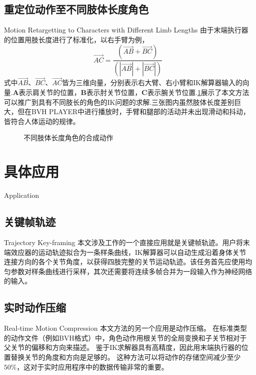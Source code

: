 \subsection{重定位动作至不同肢体长度角色}{Motion Retargetting to Characters with Different Limb Lengths}
\label{sec:Retargetting}
由于末端执行器的位置用肢长度进行了标准化，以右手臂为例，
\begin{displaymath}
\overrightarrow{AC}=\frac{(\overrightarrow{AB}+\overrightarrow{BC})}{(\left|\overrightarrow{AB}\right|+\left|\overrightarrow{BC}\right|)}
\end{displaymath}
式中$\overrightarrow{AB}$、$\overrightarrow{BC}$、$\overrightarrow{AC}$皆为三维向量，分别表示右大臂、右小臂和IK解算器输入的向量.$\mathbf{A}$表示肩关节的位置，$\mathbf{B}$表示肘关节位置，$\mathbf{C}$表示腕关节位置.\cref{fig:limb_length}展示了本文方法可以推广到具有不同肢长的角色的IK问题的求解.三张图内虽然肢体长度差别巨大，但在BVH PLAYER中进行播放时，手臂和腿部的活动并未出现滑动和抖动，皆符合人体运动的规律。
\begin{figure}
\centering
{}
\caption{不同肢体长度角色的合成动作}
\label{fig:limb_length}
\end{figure}
\section{具体应用}{Application}
\subsection{关键帧轨迹}{Trajectory Key-framing}
本文涉及工作的一个直接应用就是关键帧轨迹。用户将末端效应器的运动轨迹拟合为一条样条曲线，IK解算器可以自动生成沿着身体关节连接方向的各个关节角度，以获得四肢完整的关节运动轨迹。该任务首先应使用均匀参数对样条曲线进行采样，其次还需要将连续多帧合并为一段输入作为神经网络的输入。
\subsection{实时动作压缩}{Real-time Motion Compression}
本文方法的另一个应用是动作压缩。 在标准类型的动作文件（例如BVH格式）中，角色动作用根关节的全局变换和子关节相对于父关节的偏移和方向来描述。 鉴于IK求解器具有高精度，因此用末端执行器的位置替换关节的角度和方向是足够的。 这种方法可以将动作的存储空间减少至少$50\%$，这对于实时应用程序中的数据传输非常的重要。

